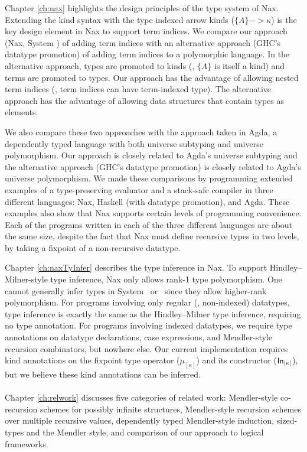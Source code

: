 Chapter \ref{ch:nax} highlights the design principles of the type system of Nax.
Extending the kind syntax with the type indexed arrow kinds ($\{A\} -> \kappa$) 
is the key design element in Nax to support term indices.
We compare our approach (Nax, System \Fi) of adding term indices with
an alternative approach (GHC's datatype promotion) of adding
term indices to a polymorphic language. In the alternative approach,
types are promoted to kinds (\ie, $\{A\}$ is itself a kind) and
terms are promoted to types. Our approach has the advantage of
allowing nested term indices (\ie, term indices can have term-indexed type).
The alternative approach has the advantage of allowing data structures that
contain types as elements.

We also compare these two approaches with the approach taken in Agda,
a dependently typed language with both universe subtyping and
universe polymorphism. Our approach is closely related to
Agda's universe subtyping and the alternative approach
(GHC's datatype promotion) is closely related to Agda's universe polymorphism.
We made these comparisons by programming extended examples of
a type-preserving evaluator and a stack-safe compiler
in three different languages: Nax, Haskell (with datatype promotion), and Agda.
These examples also show that Nax supports certain levels of
programming convenience. Each of the programs written
in each of the three different languages are about the same size,
despite the fact that Nax must define recursive types in two levels,
by taking a fixpoint of a non-recursive datatype.

Chapter \ref{ch:naxTyInfer} describes the type inference in Nax. To support
Hindley--Milner-style type inference, Nax only allows rank-1 type polymorphism.
One cannot generally infer types in System \Fi\ or \Fixi\ since they allow
higher-rank polymorphism. For programs involving only regular (\ie, non-indexed)
datatypes, type inference is exactly the same as the Hindley--Milner
type inference, requiring no type annotation. For programs involving
indexed datatypes, we require type annotations on datatype declarations,
case expressions, and Mendler-style recursion combinators, but nowhere else.
Our current implementation requires kind annotations on
the fixpoint type operator ($\mu_{[\kappa]}$) and its constructor
($\mathsf{In}_{[\kappa]}$), but we believe these kind annotations can be inferred.

\paragraph{}
Chapter \ref{ch:relwork} discusses five categories of related work:
Mendler-style co-recursion schemes for possibly infinite structures,
Mendler-style recursion schemes over multiple recursive values,
dependently typed Mendler-style induction, sized-types and the Mendler style,
and comparison of our approach to logical frameworks.

